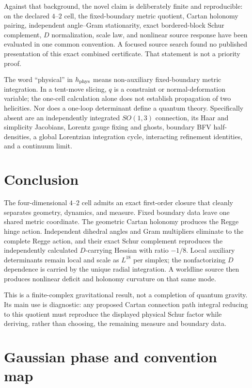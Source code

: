 \documentclass[11pt]{article}
\theoremstyle{definition}
\theoremstyle{remark}
\begin{document}
Against that background, the novel claim is deliberately finite and reproducible: on the declared $4$--$2$ cell, the fixed-boundary metric quotient, Cartan holonomy pairing, independent angle--Gram stationarity, exact bordered-block Schur complement, $D$ normalization, scale law, and nonlinear source response have been evaluated in one common convention.  A focused source search found no published presentation of this exact combined certificate.  That statement is not a priority proof.

The word ``physical'' in $h_{\rm phys}$ means non-auxiliary fixed-boundary metric integration.  In a tent-move slicing, $q$ is a constraint or normal-deformation variable; the one-cell calculation alone does not establish propagation of two helicities.  Nor does a one-loop determinant define a quantum theory.  Specifically absent are an independently integrated $SO(1,3)$ connection, its Haar and simplicity Jacobians, Lorentz gauge fixing and ghosts, boundary BFV half-densities, a global Lorentzian integration cycle, interacting refinement identities, and a continuum limit.

\section{Conclusion}

The four-dimensional $4$--$2$ cell admits an exact first-order closure that cleanly separates geometry, dynamics, and measure.  Fixed boundary data leave one shared metric coordinate.  The geometric Cartan holonomy produces the Regge hinge action.  Independent dihedral angles and Gram multipliers eliminate to the complete Regge action, and their exact Schur complement reproduces the independently calculated $D$-carrying Hessian with ratio $-1/8$.  Local auxiliary determinants remain local and scale as $L^{18}$ per simplex; the nonfactorizing $D$ dependence is carried by the unique radial integration.  A worldline source then produces nonlinear deficit and holonomy curvature on that same mode.

This is a finite-complex gravitational result, not a completion of quantum gravity.  Its main use is diagnostic: any proposed Cartan connection path integral reducing to this quotient must reproduce the displayed physical Schur factor while deriving, rather than choosing, the remaining measure and boundary data.

\appendix
\section{Gaussian phase and convention map}
\end{document}
